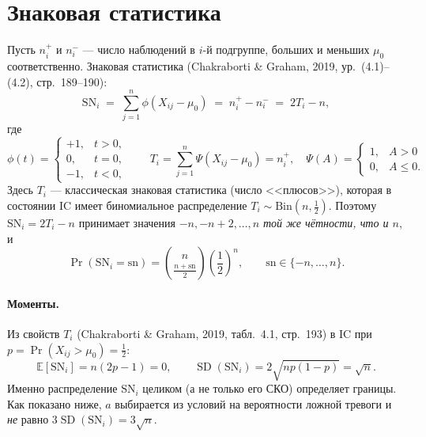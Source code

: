\documentclass[11pt,a4paper]{article}
\newcommand{\SN}{\mathrm{SN}}
\begin{document}
\section{Знаковая статистика}

Пусть $n_i^{+}$ и $n_i^{-}$ --- число наблюдений в $i$-й подгруппе,
больших и меньших $\mu_0$ соответственно. Знаковая статистика
(Chakraborti \& Graham, 2019, ур.~(4.1)--(4.2), стр.~189--190):
\begin{equation}
\SN_i \;=\; \sum_{j=1}^{n}\phi(X_{ij}-\mu_0)
       \;=\; n_i^{+}-n_i^{-}
       \;=\; 2T_i-n,
\label{eq:sn}
\end{equation}
где
\begin{equation}
\phi(t)=
\begin{cases}
 +1, & t>0,\\
  0, & t=0,\\
 -1, & t<0,
\end{cases}
\qquad
T_i=\sum_{j=1}^{n}\Psi(X_{ij}-\mu_0)=n_i^{+},
\quad
\Psi(A)=\begin{cases}1,&A>0\\0,&A\le 0.\end{cases}
\end{equation}
Здесь $T_i$ --- классическая знаковая статистика (число <<плюсов>>),
которая в состоянии IC имеет биномиальное распределение
$T_i\sim\mathrm{Bin}(n,\tfrac12)$. Поэтому
$\SN_i=2T_i-n$ принимает значения $-n,-n+2,\dots,n$ \emph{той же
чётности, что и $n$}, и
\begin{equation}
\Pr(\SN_i=\mathrm{sn}) = \binom{n}{\tfrac{n+\mathrm{sn}}{2}}\left(\frac12\right)^{\!n},
\qquad \mathrm{sn}\in\{-n,\dots,n\}.
\label{eq:snpmf}
\end{equation}

\paragraph{Моменты.} Из свойств $T_i$ (Chakraborti \& Graham, 2019,
табл.~4.1, стр.~193) в IC при $p=\Pr(X_{ij}>\mu_0)=\tfrac12$:
\begin{equation}
\mathbb{E}[\SN_i]=n(2p-1)=0,
\qquad
\operatorname{SD}(\SN_i)=2\sqrt{np(1-p)}=\sqrt{n}.
\label{eq:snmoments}
\end{equation}
Именно распределение $\SN_i$ целиком (а не только его СКО) определяет
границы. Как показано ниже, $a$ выбирается из условий на вероятности
ложной тревоги и \emph{не} равно $3\operatorname{SD}(\SN_i)=3\sqrt{n}$.
\end{document}
